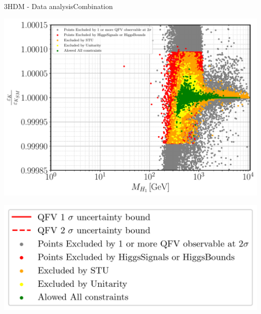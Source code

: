 \documentclass[10pt,xcolor=dvipsnames,mathserif]{beamer}
\begin{document}
\begin{frame}{3HDM - Data analysis}{Combination}
\begin{minipage}[t]{.32\textwidth}
	\includegraphics[width=\textwidth]{Images/3HDM/Reds/Eps_K_H1_Thighter_Centered.pdf}
	\end{minipage}
	\begin{minipage}[t]{.32\textwidth}
	\centering
	\includegraphics[width=\textwidth]{legend2-01.png} 
	\end{minipage}



\end{frame}
\end{document}
